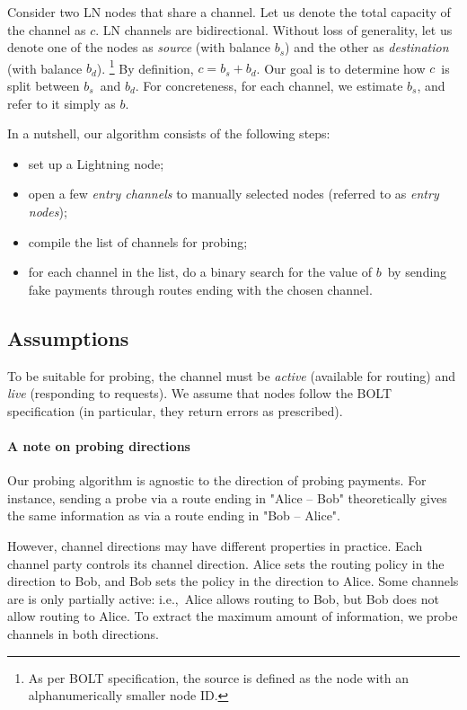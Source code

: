 Consider two LN nodes that share a channel.
Let us denote the total capacity of the channel as $c$.
LN channels are bidirectional.
Without loss of generality, let us denote one of the nodes as \textit{source} (with balance $b_s$) and the other as \textit{destination} (with balance $b_d$).
\footnote{As per BOLT specification, the source is defined as the node with an alphanumerically smaller node ID.}
By definition, $c = b_s + b_d$.
Our goal is to determine how $c$~is split between $b_s$~and $b_d$.
For concreteness, for each channel, we estimate $b_s$, and refer to it simply as $b$.

In a nutshell, our algorithm consists of the following steps:
\begin{itemize}
	\item set up a Lightning node;
	\item open a few \textit{entry channels} to manually selected nodes (referred to as \textit{entry nodes});
	\item compile the list of channels for probing;
	\item for each channel in the list, do a binary search for the value of $b$~by sending fake payments through routes ending with the chosen channel.
\end{itemize}

\subsection{Assumptions}

To be suitable for probing, the channel must be \textit{active} (available for routing) and \textit{live} (responding to requests).
We assume that nodes follow the BOLT specification (in particular, they return errors as prescribed).

\paragraph{A note on probing directions}
Our probing algorithm is agnostic to the direction of probing payments.
For instance, sending a probe via a route ending in "Alice -- Bob" theoretically gives the same information as via a route ending in "Bob -- Alice".

However, channel directions may have different properties in practice.
Each channel party controls its channel direction.
Alice sets the routing policy in the direction to Bob, and Bob sets the policy in the direction to Alice.
Some channels are is only partially active: i.e.,~Alice allows routing to Bob, but Bob does not allow routing to Alice.
To extract the maximum amount of information, we probe channels in both directions.

